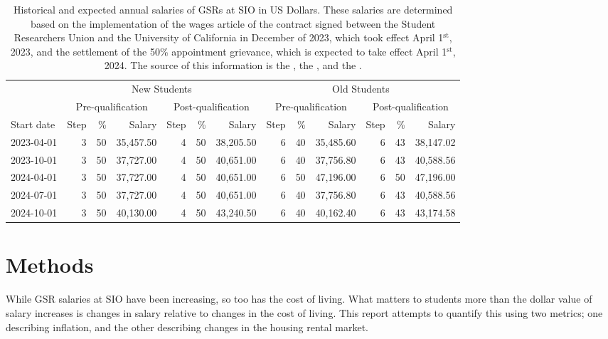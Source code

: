 \documentclass{article}
\begin{document}
\begin{table}[h]
	\centering
	\caption{Historical and expected annual salaries of GSRs at SIO in US Dollars. These salaries are determined based on the implementation of the wages article of the contract signed between the Student Researchers Union and the University of California in December of 2023, which took effect April 1$^\text{st}$, 2023, and the settlement of the 50\% appointment grievance, which is expected to take effect April 1$^\text{st}$, 2024. The source of this information is the \cite{gsr_contract}, the \cite{salary_implementation_email}, and the \cite{uc_uaw_page}.}
	\label{tab:contract}
	\begin{tabular}{l r r r r r r r r r r r r}
		\hline		
		& \multicolumn{6}{c}{New Students} & \multicolumn{6}{c}{Old Students} \\
		& \multicolumn{3}{c}{Pre-qualification} & \multicolumn{3}{c}{Post-qualification} & \multicolumn{3}{c}{Pre-qualification} & \multicolumn{3}{c}{Post-qualification} \\
		\hline
		Start date & Step & \% & Salary & Step & \% & Salary & Step & \% & Salary & Step & \% & Salary \\
		\hline
		2023-04-01 & 3 & 50 & 35,457.50 & 4 & 50 & 38,205.50 & 6 & 40 & 35,485.60 & 6 & 43 & 38,147.02 \\
		2023-10-01 & 3 & 50 & 37,727.00 & 4 & 50 & 40,651.00 & 6 & 40 & 37,756.80 & 6 & 43 & 40,588.56 \\
		2024-04-01 & 3 & 50 & 37,727.00 & 4 & 50 & 40,651.00 & 6 & 50 & 47,196.00 & 6 & 50 & 47,196.00 \\
		2024-07-01 & 3 & 50 & 37,727.00 & 4 & 50 & 40,651.00 & 6 & 40 & 37,756.80 & 6 & 43 & 40,588.56 \\
		2024-10-01 & 3 & 50 & 40,130.00 & 4 & 50 & 43,240.50 & 6 & 40 & 40,162.40 & 6 & 43 & 43,174.58 \\
		\hline
	\end{tabular}
\end{table}

\section{Methods}

\label{sec:methods}

While GSR salaries at SIO have been increasing, so too has the cost of living. What matters to students more than the dollar value of salary increases is changes in salary relative to changes in the cost of living. This report attempts to quantify this using two metrics; one describing inflation, and the other describing changes in the housing rental market.
\end{document}
